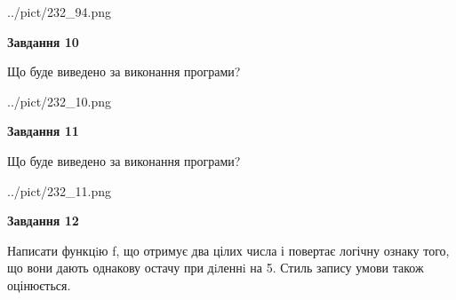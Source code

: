 \documentclass[12pt, ukrainian]{article}
\begin{document}
{\begin {large}
\begin{center}
	{../pict/232_94.png}
\end{center}
\newpage

{\begin {center}\textbf{Завдання 10}\end {center}}

Що буде виведено за виконання програми?\par
\begin{center}
	{../pict/232_10.png}
\end{center}
\newpage

{\begin {center}\textbf{Завдання 11}\end {center}}

Що буде виведено за виконання програми?\par
\begin{center}
	{../pict/232_11.png}
\end{center}
\newpage

{\begin {center}\textbf{Завдання 12}\end {center}}


Написати функцiю f, що отримує два цілих числа і повертає логічну ознаку того, що вони дають однакову остачу при дiленнi на 5. Стиль запису умови також оцінюється.\par
\newpage

\end {large}}
\end{document}
